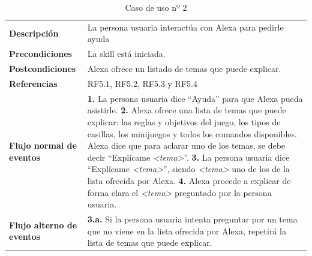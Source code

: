 \begin{table}[H]
	\centering
	\begin{tabular}{|p{3cm}|p{12cm}|}
		\hline
		\rowcolor{lightgray}
		\multicolumn{2}{|c|}{\textbf{CU02}: Pedir ayuda} \\
		\hline
		\textbf{Descripción} & La persona usuaria interactúa con Alexa para pedirle ayuda \vspace{0.2cm} \\
		\hline
		\textbf{Precondiciones} & La skill está iniciada. \vspace{0.2cm} \\
		\hline
		\textbf{Postcondiciones} & Alexa ofrece un listado de temas que puede explicar. \vspace{0.2cm} \\
		\hline
		\textbf{Referencias} & RF5.1, RF5.2, RF5.3 y RF5.4 \vspace{0.2cm} \\
		\hline
		\textbf{Flujo normal de eventos} &
		\textbf{1.} La persona usuaria dice \enquote{Ayuda} para que Alexa pueda asistirle. \newline
		\vspace{0.2cm}
		\textbf{2.} Alexa ofrece una lista de temas que puede explicar: las reglas y objetivos del juego, los tipos de casillas, los minijuegos y todos los comandos disponibles. Alexa dice que para aclarar uno de los temas, se debe decir \enquote{Explícame \textit{<tema>}}. \newline
		\vspace{0.2cm}
		\textbf{3.} La persona usuaria dice \enquote{Explícame \textit{<tema>}}, siendo \textit{<tema>} uno de los de la lista ofrecida por Alexa. \newline
		\vspace{0.2cm} 
		\textbf{4.} Alexa procede a explicar de forma clara el \textit{<tema>} preguntado por la persona usuaria.
		\vspace{0.2cm}\\
		\hline
		\textbf{Flujo alterno de eventos} &
		\textbf{3.a.} Si la persona usuaria intenta preguntar por un tema que no viene en la lista ofrecida por Alexa, repetirá la lista de temas que puede explicar. \vspace{0.2cm} \\
		\hline
	\end{tabular}
	\caption{Caso de uso nº 2}
	\label{tab:CU02}
\end{table}

